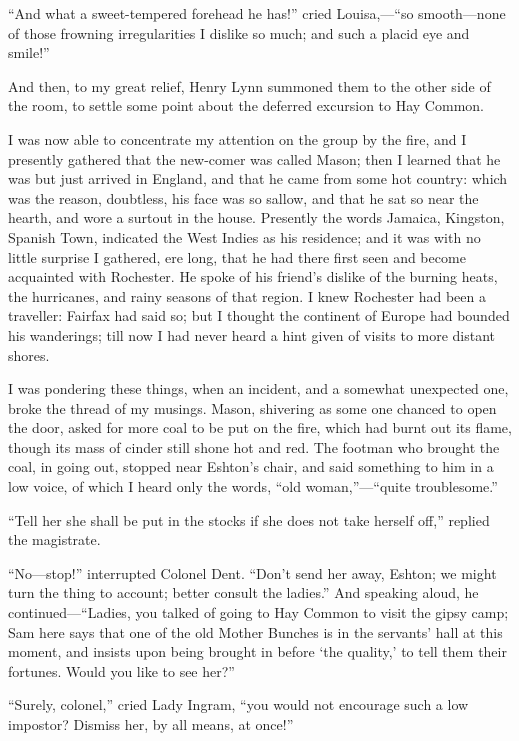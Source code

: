 \enquote{And what a sweet-tempered forehead he has!} cried
Louisa,---\enquote{so smooth---none of those frowning irregularities I
	dislike so much; and such a placid eye and smile!}

And then, to my great relief, \Mr{} Henry Lynn summoned them to the other
side of the room, to settle some point about the deferred excursion to
Hay Common.

I was now able to concentrate my attention on the group by the fire, and
I presently gathered that the new-comer was called \Mr{} Mason; then I
learned that he was but just arrived in England, and that he came from
some hot country: which was the reason, doubtless, his face was so
sallow, and that he sat so near the hearth, and wore a surtout in the
house. Presently the words Jamaica, Kingston, Spanish Town, indicated
the West Indies as his residence; and it was with no little surprise I
gathered, ere long, that he had there first seen and become acquainted
with \Mr{} Rochester. He spoke of his friend's dislike of the burning
heats, the hurricanes, and rainy seasons of that region. I knew \Mr{}
Rochester had been a traveller: \Mrs{} Fairfax had said so; but I thought
the continent of Europe had bounded his wanderings; till now I had never
heard a hint given of visits to more distant shores.

I was pondering these things, when an incident, and a somewhat
unexpected one, broke the thread of my musings. \Mr{} Mason, shivering as
some one chanced to open the door, asked for more coal to be put on the
fire, which had burnt out its flame, though its mass of cinder still
shone hot and red. The footman who brought the coal, in going out,
stopped near \Mr{} Eshton's chair, and said something to him in a low
voice, of which I heard only the words, \enquote{old
	woman,}---\enquote{quite troublesome.}

\enquote{Tell her she shall be put in the stocks if she does not take
	herself off,} replied the magistrate.

\enquote{No---stop!} interrupted Colonel Dent. \enquote{Don't send her
	away, Eshton; we might turn the thing to account; better consult the
	ladies.} And speaking aloud, he continued---\enquote{Ladies, you talked
	of going to Hay Common to visit the gipsy camp; Sam here says that one
	of the old Mother Bunches is in the servants' hall at this moment, and
	insists upon being brought in before \enquote{the quality,} to tell
	them their fortunes. Would you like to see her?}

\enquote{Surely, colonel,} cried Lady Ingram, \enquote{you would not
	encourage such a low impostor? Dismiss her, by all means, at once!}

